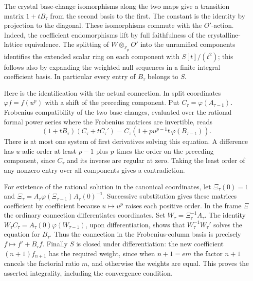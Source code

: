 The crystal base-change isomorphisms along the two maps give a
transition matrix $1+tB_\tau$ from the second basis to the first.
The constant is the identity by projection to the diagonal. These
isomorphisms commute with the $O'$-action. Indeed, the coefficient
endomorphisms lift by full faithfulness of the crystalline-lattice
equivalence. The splitting of $W\otimes_{\mathbb Z_p}O'$ into the
unramified components identifies the extended scalar ring on each
component with $S[t]/(t^2)$; this follows also by expanding the
weighted null sequences in a finite integral coefficient basis.
In particular every entry of $B_\tau$ belongs to $S$.

Here is the identification with the actual connection. In split
coordinates $\varphi f=f(u^p)$ with a shift of the preceding component.
Put $C_\tau=\varphi(A_{\tau-1})$. Frobenius compatibility of the
two base changes, evaluated over the rational formal power series
where the Frobenius matrices are invertible, reads
\[
 (1+tB_\tau)(C_\tau+tC_\tau')
   =C_\tau(1+pu^{p-1}t\,\varphi(B_{\tau-1})).
\]
There is at most one system of first derivatives solving this
equation. A difference has $u$-adic order at least $p-1$ plus $p$
times the order on the preceding component, since $C_\tau$ and its
inverse are regular at zero. Taking the least order of any nonzero
entry over all components gives a contradiction.

For existence of the rational solution in the canonical coordinates,
let $\Xi_\tau(0)=1$ and
$\Xi_\tau=A_\tau\varphi(\Xi_{\tau-1})A_\tau(0)^{-1}$.
Successive substitution gives these matrices coefficient by
coefficient because $u\mapsto u^p$ raises each positive order.
In the frame $\Xi$ the ordinary connection differentiates coordinates.
Set $W_\tau=\Xi_\tau^{-1}A_\tau$. The identity
$W_\tau C_\tau=A_\tau(0)\varphi(W_{\tau-1})$, upon differentiation,
shows that $W_\tau^{-1}W_\tau'$ solves the equation for $B_\tau$.
Thus the connection in the Frobenius-column basis is precisely
$f\mapsto f'+B_\tau f$. Finally $S$ is closed under differentiation:
the new coefficient $(n+1)f_{n+1}$ has the required weight, since
when $n+1=em$ the factor $n+1$ cancels the factorial ratio $m$,
and otherwise the weights are equal. This proves the asserted
integrality, including the convergence condition.

